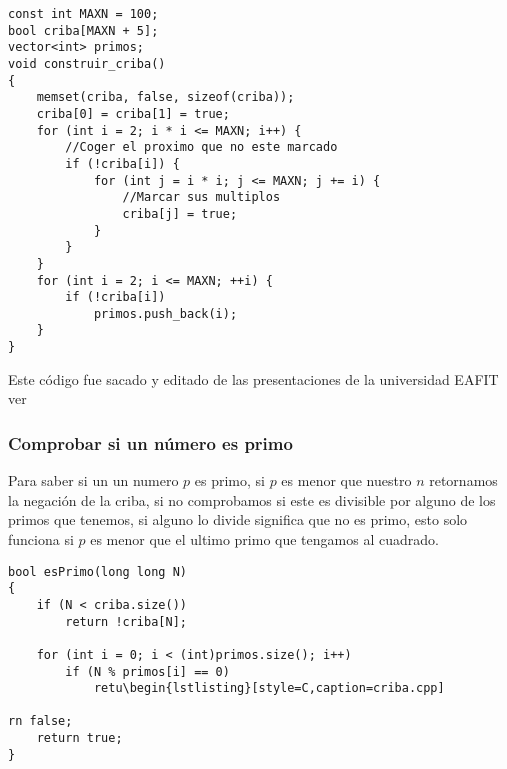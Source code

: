 \begin{lstlisting}[style=C,caption=criba.cpp]
const int MAXN = 100;
bool criba[MAXN + 5];
vector<int> primos;
void construir_criba()
{
    memset(criba, false, sizeof(criba));
    criba[0] = criba[1] = true;
    for (int i = 2; i * i <= MAXN; i++) {
        //Coger el proximo que no este marcado
        if (!criba[i]) {
            for (int j = i * i; j <= MAXN; j += i) {
                //Marcar sus multiplos
                criba[j] = true;
            }
        }
    }
    for (int i = 2; i <= MAXN; ++i) {
        if (!criba[i])
            primos.push_back(i);
    }
}
\end{lstlisting}
Este código fue sacado y editado de las presentaciones de la universidad EAFIT ver \cite{SemilleroProgramacion:Online}

\subsubsection{Comprobar si un número es primo}
Para saber si un un numero $p$ es primo, si $p$ es menor  que nuestro $n$ retornamos la negación de la criba, si no comprobamos si este es divisible por alguno de los primos que tenemos, si alguno lo divide significa que no es primo, esto solo  funciona si $p$ es menor que el ultimo primo que tengamos al cuadrado.
\begin{minipage}{\textwidth}
\begin{lstlisting}[style=C,caption=criba.cpp]
bool esPrimo(long long N)
{
    if (N < criba.size())
        return !criba[N];

    for (int i = 0; i < (int)primos.size(); i++)
        if (N % primos[i] == 0)
            retu\begin{lstlisting}[style=C,caption=criba.cpp]

rn false;
    return true;
}
\end{lstlisting}
\end{minipage}
